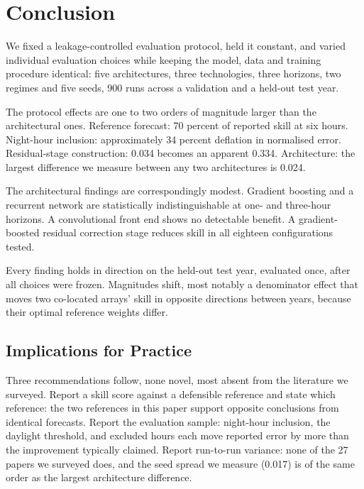 \section{Conclusion}
\label{sec:conclusion}

We fixed a leakage-controlled evaluation protocol, held it constant,
and varied individual evaluation choices while keeping the model, data
and training procedure identical: five architectures, three
technologies, three horizons, two regimes and five seeds, 900 runs
across a validation and a held-out test year.

The protocol effects are one to two orders of magnitude larger than the
architectural ones. Reference forecast: 70 percent of reported skill at
six hours. Night-hour inclusion: approximately 34 percent deflation in
normalised error. Residual-stage construction: 0.034 becomes an
apparent 0.334. Architecture: the largest difference we measure between
any two architectures is 0.024.

The architectural findings are correspondingly modest. Gradient
boosting and a recurrent network are statistically indistinguishable at
one- and three-hour horizons. A convolutional front end shows no
detectable benefit. A gradient-boosted residual correction stage
reduces skill in all eighteen configurations tested.

Every finding holds in direction on the held-out test year, evaluated
once, after all choices were frozen. Magnitudes shift, most notably a
denominator effect that moves two co-located arrays' skill in opposite
directions between years, because their optimal reference weights
differ.

\subsection{Implications for Practice}
\label{sec:conclusion-implications}

Three recommendations follow, none novel, most absent from the
literature we surveyed. Report a skill score against a defensible
reference and state which reference: the two references in this paper
support opposite conclusions from identical forecasts. Report the
evaluation sample: night-hour inclusion, the daylight threshold, and
excluded hours each move reported error by more than the improvement
typically claimed. Report run-to-run variance: none of the 27 papers we
surveyed does, and the seed spread we measure (0.017) is of the same
order as the largest architecture difference.

